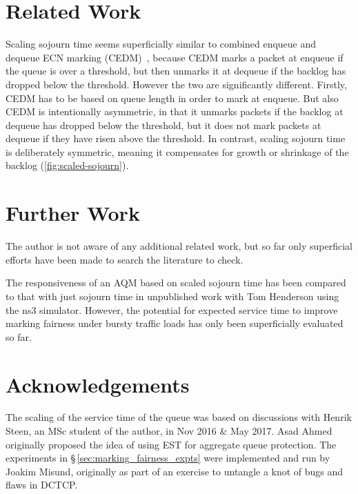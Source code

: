 \section{Related Work}\label{sec:related}

Scaling sojourn time seems superficially similar to combined enqueue and dequeue ECN marking (CEDM)~\cite{Shan17:CEDM}, because CEDM marks a packet at enqueue if the queue is over a threshold, but then unmarks it at dequeue if the backlog has dropped below the threshold. However the two are significantly different. Firstly, CEDM has to be based on queue length in order to mark at enqueue. But also CEDM is intentionally asymmetric, in that it unmarks packets if the backlog at dequeue has dropped below the threshold, but it does not mark packets at dequeue if they have risen above the threshold. In contrast, scaling sojourn time is deliberately symmetric, meaning it compensates for growth or shrinkage of the backlog (\autoref{fig:scaled-sojourn}).

\section{Further Work}

The author is not aware of any additional related work, but so far only superficial efforts have been made to search the literature to check.

The responsiveness of an AQM based on scaled sojourn time has been compared to that with just sojourn time in unpublished work with Tom Henderson using the ns3 simulator. However, the potential for expected service time to improve marking fairness under bursty traffic loads has only been superficially evaluated so far.

\section{Acknowledgements}\label{sigqdyntr_acks}

The scaling of the service time of the queue was based on discussions with Henrik Steen, an MSc student of the author, in Nov 2016 \& May 2017. Asad Ahmed originally proposed the idea of using EST for aggregate queue protection. The experiments in \S\,\ref{sec:marking_fairness_expts} were implemented and run by Joakim Misund, originally as part of an exercise to untangle a knot of bugs and flaws in DCTCP.
